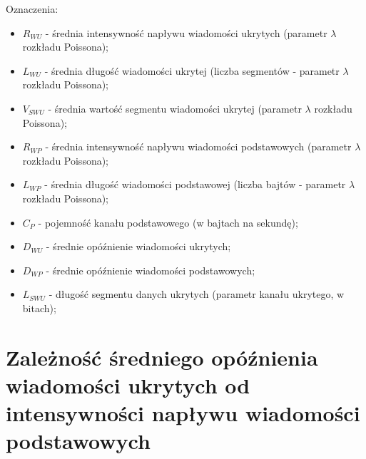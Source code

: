 \documentclass[a4paper, twoside, 12pt]{report}
\begin{document}
    Oznaczenia:
    \begin{itemize} \itemsep1pt \parskip0pt 
        \item \( R_{WU} \) - średnia intensywność napływu wiadomości ukrytych (parametr \(\lambda\) rozkładu Poissona);
        \item \( L_{WU} \) - średnia długość wiadomości ukrytej (liczba segmentów - parametr \(\lambda\) rozkładu Poissona);
        \item \( V_{SWU} \) - średnia wartość segmentu wiadomości ukrytej (parametr \(\lambda\) rozkładu Poissona);
        \item \( R_{WP} \) - średnia intensywność napływu wiadomości podstawowych (parametr \(\lambda\) rozkładu Poissona);
        \item \( L_{WP} \) - średnia długość wiadomości podstawowej (liczba bajtów - parametr \(\lambda\) rozkładu Poissona);
        \item \( C_P \) - pojemność kanału podstawowego (w bajtach na sekundę);
        \item \( D_{WU} \) - średnie opóźnienie wiadomości ukrytych;
        \item \( D_{WP} \) - średnie opóźnienie wiadomości podstawowych;
        \item \( L_{SWU} \) - długość segmentu danych ukrytych (parametr kanału ukrytego, w bitach);
    \end{itemize}



    \section{Zależność średniego opóźnienia wiadomości ukrytych od intensywności napływu wiadomości podstawowych}
\end{document}
